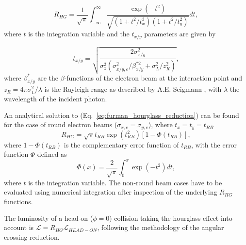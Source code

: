 \documentclass[../main.tex]{subfiles}
\begin{document}
\begin{equation}
R_{HG} = \frac{1}{\sqrt{\pi}}\int_{-\infty}^{\infty}\frac{\exp\left(-t^{2}\right)}{\sqrt{\left(1+t^{2}/t_{x}^{3}\right)\left(1+t^{2}/t_{y}^{2}\right)}}dt,
\label{eq:furman_hourglass_reduction}    
\end{equation}
where $t$ is the integration variable and the $t_{x/y}$ parameters are given by

\begin{equation}
t_{x/y} = \sqrt{\frac{2\sigma_{x/y}^{2}}{\sigma_{z}^{2}\left(\sigma_{x/y,e}^{2}/\beta_{x/y}^{*2}+\sigma_{L}^{2}/z_{R}^{2}\right)}},
\label{eq:furman_txy_parameters}    
\end{equation}
where $\beta_{x/y}^{*}$ are the $\beta$-functions of the electron beam at the interaction point and $z_{R}=4\pi\sigma_{L}^{2}/\lambda$ is the Rayleigh range as described by A.E. Seigmann \cite{siegmann1986lasers}, with $\lambda$ the wavelength of the incident photon.

An analytical solution to (Eq.~\ref{eq:furman_hourglass_reduction}) can be found for the case of round electron beams ($\sigma_{x,e}=\sigma_{y,e}$), where $t_{x}=t_{y}=t_{RB}$
\begin{equation}
R_{HG} = \sqrt{\pi}t_{RB}\exp\left(t_{RB}^{2}\right)\left[1-\Phi\left(t_{RB}\right)\right],
\label{eq:furman_hourglass_reduction_analytical}    
\end{equation}
where $1-\Phi\left(t_{RB}\right)$ is the complementary error function of $t_{RB}$, with the error function $\Phi$ defined as
\begin{equation}
\Phi\left(x\right) = \frac{2}{\sqrt{\pi}}\int_{0}^{x}\exp\left(-t^{2}\right)dt,
\label{eq:error_function}    
\end{equation}
where $t$ is the integration variable. The non-round beam cases have to be evaluated using numerical integration after inspection of the underlying $R_{HG}$ functions.

The luminosity of a head-on ($\phi = 0$) collision taking the hourglass effect into account is $\mathcal{L} = R_{HG}\mathcal{L}_{HEAD-ON}$, following the methodology of the angular crossing reduction.
\end{document}
